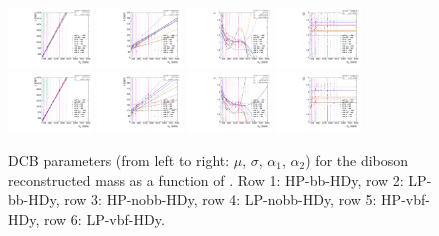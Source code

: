 \begin{figure}[htbp]
  \includegraphics[width=0.2\textwidth]{fig/analysis/paramSignalShape_allSig_MVV_HP_vbf_DEtaHi_MEAN.pdf}
  \includegraphics[width=0.2\textwidth]{fig/analysis/paramSignalShape_allSig_MVV_HP_vbf_DEtaHi_SIGMA.pdf}
  \includegraphics[width=0.2\textwidth]{fig/analysis/paramSignalShape_allSig_MVV_HP_vbf_DEtaHi_ALPHA1.pdf}
  \includegraphics[width=0.2\textwidth]{fig/analysis/paramSignalShape_allSig_MVV_HP_vbf_DEtaHi_ALPHA2.pdf}\\
  \includegraphics[width=0.2\textwidth]{fig/analysis/paramSignalShape_allSig_MVV_LP_vbf_DEtaHi_MEAN.pdf}
  \includegraphics[width=0.2\textwidth]{fig/analysis/paramSignalShape_allSig_MVV_LP_vbf_DEtaHi_SIGMA.pdf}
  \includegraphics[width=0.2\textwidth]{fig/analysis/paramSignalShape_allSig_MVV_LP_vbf_DEtaHi_ALPHA1.pdf}
  \includegraphics[width=0.2\textwidth]{fig/analysis/paramSignalShape_allSig_MVV_LP_vbf_DEtaHi_ALPHA2.pdf}\\
  \caption{
    DCB parameters (from left to right: $\mu$, $\sigma$, $\alpha_1$, $\alpha_2$) for the diboson reconstructed mass \MVV as a function of \MX.
    Row 1: HP-bb-HDy, row 2: LP-bb-HDy, row 3: HP-nobb-HDy, row 4: LP-nobb-HDy, row 5: HP-vbf-HDy, row 6: LP-vbf-HDy.
  }
  \label{fig:MVVShapes_NonVBF_HDy_Run2}
\end{figure}

